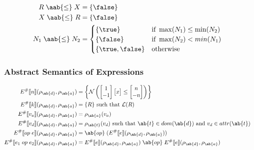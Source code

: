 \begin{align}
    R \;\aab{\leq}\; X &= \{\false\} \\
    X \;\aab{\leq}\; R &= \{\false\} \\
    N_1 \;\aab{\leq}\; N_2 &= \begin{cases}
        \{\true\} & \text{if } \max(N_1) \leq \min(N_2) \\
        \{\false\} & \text{if } \max(N_2) < min (N_1) \\
        \{\true, \false\} & \text{otherwise}
    \end{cases} \\
\end{align}

\subsubsection{Abstract Semantics of Expressions}

\begin{align}
    \absexpsem{n}(\rho_{\ab{d}}, \rho_{\ab{a}}) &= \left\{ \mathcal{N} \left(
        \begin{bmatrix}
            1 \\
            -1
        \end{bmatrix}
        \begin{bmatrix}
           x
        \end{bmatrix}
        \leq
        \begin{bmatrix}
            n \\
            -n
        \end{bmatrix}
    \right) \right\} \\
    \absexpsem{k}(\rho_{\ab{d}}, \rho_{\ab{a}}) &= \{ R \} \text{ such that }\mathcal{L}(R) \\
    \absexpsem{v_a}(\rho_{\ab{d}}, \rho_{\ab{a}}) &=  \rho_{\ab{a}}(v_a) \\
    \absexpsem{v_d}(\rho_{\ab{d}}, \rho_{\ab{a}}) &=  \rho_{\ab{t}}(v_d) \text{ such that } \ab{t} \in dom(\ab{d}) \text{ and } v_d \in attr(\ab{t}) \\
    \absexpsem{op \; e}(\rho_{\ab{d}}, \rho_{\ab{a}}) &= \ab{op} \; (\absexpsem{e}(\rho_{\ab{d}}, \rho_{\ab{a}})) \\
    \absexpsem{e_1 \; op \; e_2}(\rho_{\ab{d}}, \rho_{\ab{a}}) &= \absexpsem{e}(\rho_{\ab{d}}, \rho_{\ab{a}}) \;\ab{op}\; \absexpsem{e}(\rho_{\ab{d}}, \rho_{\ab{a}})\\
\end{align}

